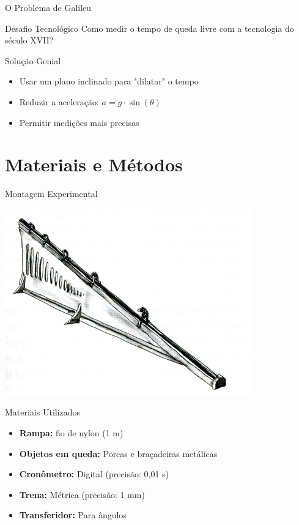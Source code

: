 \documentclass[12pt]{beamer}
\begin{document}
\begin{frame}{O Problema de Galileu}
    \begin{block}{Desafio Tecnológico}
        Como medir o tempo de queda livre com a tecnologia do século XVII?
    \end{block}


    \begin{block}{Solução Genial}
        \begin{itemize}
            \item Usar um plano inclinado para "dilatar" o tempo
            \item Reduzir a aceleração: $a = g \cdot \sin(\theta)$
            \item Permitir medições mais precisas
        \end{itemize}
    \end{block}
\end{frame}

\section{Materiais e Métodos}

\begin{frame}{Montagem Experimental}
    \begin{center}
        \includegraphics[width=0.8\textwidth]{pictures/planoInclinado.png}
    \end{center}
\end{frame}

\begin{frame}{Materiais Utilizados}
    \begin{itemize}
        \item \textbf{Rampa:} fio de nylon (1 m)
        \item \textbf{Objetos em queda:} Porcas e braçadeiras metálicas
        \item \textbf{Cronômetro:} Digital (precisão: 0,01 s)
        \item \textbf{Trena:} Métrica (precisão: 1 mm)
        \item \textbf{Transferidor:} Para ângulos
    \end{itemize}
\end{frame}
\end{document}
